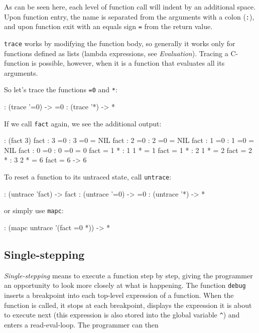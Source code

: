 As can be seen here, each level of function call will indent by an
additional space. Upon function entry, the name is separated from the
arguments with a colon (\texttt{:}), and upon function exit with an equals sign
 \texttt{=}  from the return value.

\texttt{trace} works by modifying the function body, so generally it works only
for functions defined as lists (lambda expressions, see
\emph{Evaluation}). Tracing a C-function is possible, however,
when it is a function that evaluates all its arguments.

So let's trace the functions \texttt{=0} and \texttt{*}:


\begin{wideverbatim}
: (trace '=0)
-> =0
: (trace '*)
-> *
\end{wideverbatim}

If we call \texttt{fact} again, we see the additional output:


\begin{wideverbatim}
: (fact 3)
 fact : 3
  =0 : 3
  =0 = NIL
  fact : 2
   =0 : 2
   =0 = NIL
   fact : 1
    =0 : 1
    =0 = NIL
    fact : 0
     =0 : 0
     =0 = 0
    fact = 1
    * : 1 1
    * = 1
   fact = 1
   * : 2 1
   * = 2
  fact = 2
  * : 3 2
  * = 6
 fact = 6
-> 6
\end{wideverbatim}

To reset a function to its untraced state, call \texttt{untrace}:


\begin{wideverbatim}
: (untrace 'fact)
-> fact
: (untrace '=0)
-> =0
: (untrace '*)
-> *
\end{wideverbatim}

or simply use \texttt{mapc}:

\begin{wideverbatim}
: (mapc untrace '(fact =0 *))
-> *
\end{wideverbatim}

 
\subsection{Single-stepping}
\label{sec:tut-single-stepping}


\emph{Single-stepping} means to execute a function step by step, giving the
programmer an opportunity to look more closely at what is happening. The
function \texttt{debug} inserts a breakpoint into each top-level expression of
a function. When the function is called, it stops at each breakpoint,
displays the expression it is about to execute next (this expression is
also stored into the global variable \texttt{\textasciicircum{}}) and enters a read-eval-loop.
The programmer can then

